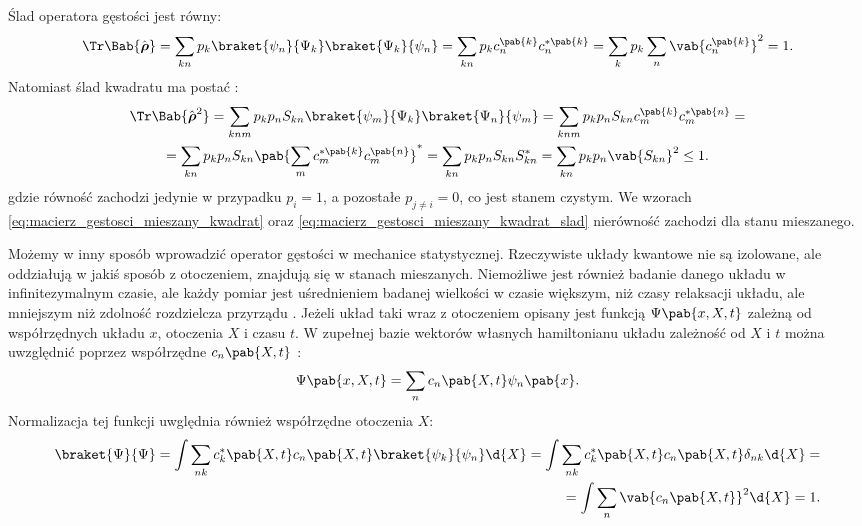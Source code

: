 Ślad operatora gęstości jest równy:
\begin{equation}\label{eq:macierz_gestosci_mieszany_slad}
	\Tr\Bab{\vu{\rho}} =
	\sum_{kn} p_k \braket{\psi_n}{\Psi_k}\braket{\Psi_k}{\psi_n} =
	\sum_{kn} p_k c_{n}^{\pab{k}} c_{n}^{*\pab{k}} =
	\sum_{k} p_k \sum_{n} \vab{c_{n}^{\pab{k}}}^2 = 1.
\end{equation}
Natomiast ślad kwadratu ma postać \cite{zubariew}:
\begin{multline}\label{eq:macierz_gestosci_mieszany_kwadrat_slad}
	\Tr\Bab{\vu{\rho}^2} =
	\sum_{knm} p_k p_n S_{kn} \braket{\psi_m}{\Psi_k}\braket{\Psi_n}{\psi_m} =
	\sum_{knm} p_k p_n S_{kn} c_{m}^{\pab{k}}c_{m}^{*\pab{n}} = \\ =
	\sum_{kn} p_k p_n S_{kn} \pab{\sum_{m} c_{m}^{*\pab{k}}c_{m}^{\pab{n}}}^{*} =
	\sum_{kn} p_k p_n S_{kn} S_{kn}^{*} =
	\sum_{kn} p_k p_n \vab{S_{kn}}^2 \leq 1.
\end{multline}
gdzie równość zachodzi jedynie w przypadku \(p_i = 1\), a pozostałe \(p_{j \neq i} = 0\), co jest stanem czystym. We wzorach \eqref{eq:macierz_gestosci_mieszany_kwadrat} oraz \eqref{eq:macierz_gestosci_mieszany_kwadrat_slad} nierówność zachodzi dla stanu mieszanego.

Możemy w inny sposób wprowadzić operator gęstości w mechanice statystycznej. Rzeczywiste układy kwantowe nie są izolowane, ale oddziałują w jakiś sposób z otoczeniem, znajdują się w stanach mieszanych. Niemożliwe jest również badanie danego układu w infinitezymalnym czasie, ale każdy pomiar jest uśrednieniem badanej wielkości w czasie większym, niż czasy relaksacji układu, ale mniejszym niż zdolność rozdzielcza przyrządu \cite{b:huang_mechanika_statystyczna}. Jeżeli układ taki wraz z otoczeniem opisany jest funkcją \(\Psi\pab{x,X,t}\) zależną od współrzędnych układu \(x\), otoczenia \(X\) i czasu \(t\). W zupełnej bazie wektorów własnych hamiltonianu układu zależność od \(X\) i \(t\) można uwzględnić poprzez współrzędne \(c_{n}\pab{X,t}\) \cite{b:huang_podstawy_fizyki_statystycznej}:
\begin{equation}
	\Psi\pab{x,X,t} = \sum_{n} c_{n}\pab{X,t} \psi_{n}\pab{x}.
\end{equation}
Normalizacja tej funkcji uwględnia również współrzędne otoczenia \(X\):
\begin{equation}
\begin{split}
	\braket{\Psi}{\Psi} =
	\int \sum_{nk} c_{k}^{*}\pab{X,t}c_{n}\pab{X,t} \braket{\psi_{k}}{\psi_{n}} \d{X} =
	\int \sum_{nk} c_{k}^{*}\pab{X,t}c_{n}\pab{X,t} \delta_{nk} \d{X} = \\ =
	\int \sum_{n} \vab{c_{n}\pab{X,t}}^2 \d{X} = 1.
\end{split}
\end{equation}

